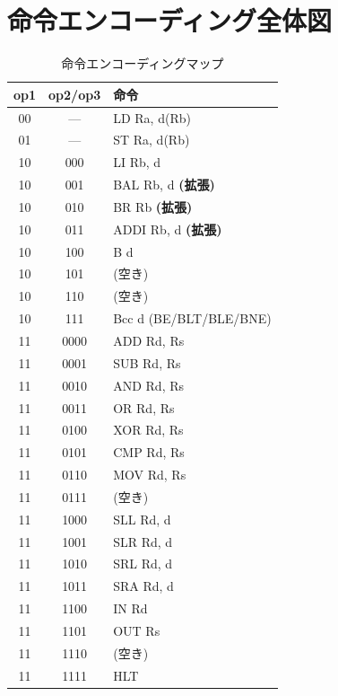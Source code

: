 \documentclass[a4paper,11pt]{ltjsarticle}
\begin{document}
\section{命令エンコーディング全体図}

\begin{table}[h]
\centering
\caption{命令エンコーディングマップ}
\small
\begin{tabular}{cc|l}
\toprule
op1 & op2/op3 & 命令 \\
\midrule
00 & --- & LD Ra, d(Rb) \\
01 & --- & ST Ra, d(Rb) \\
\midrule
10 & 000 & LI Rb, d \\
10 & 001 & BAL Rb, d \textbf{(拡張)} \\
10 & 010 & BR Rb \textbf{(拡張)} \\
10 & 011 & ADDI Rb, d \textbf{(拡張)} \\
10 & 100 & B d \\
10 & 101 & (空き) \\
10 & 110 & (空き) \\
10 & 111 & Bcc d (BE/BLT/BLE/BNE) \\
\midrule
11 & 0000 & ADD Rd, Rs \\
11 & 0001 & SUB Rd, Rs \\
11 & 0010 & AND Rd, Rs \\
11 & 0011 & OR Rd, Rs \\
11 & 0100 & XOR Rd, Rs \\
11 & 0101 & CMP Rd, Rs \\
11 & 0110 & MOV Rd, Rs \\
11 & 0111 & (空き) \\
11 & 1000 & SLL Rd, d \\
11 & 1001 & SLR Rd, d \\
11 & 1010 & SRL Rd, d \\
11 & 1011 & SRA Rd, d \\
11 & 1100 & IN Rd \\
11 & 1101 & OUT Rs \\
11 & 1110 & (空き) \\
11 & 1111 & HLT \\
\bottomrule
\end{tabular}
\end{table}
\end{document}
